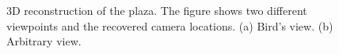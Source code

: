 \begin{figure}
\centerline{
}
\caption{3D reconstruction of the plaza. The figure shows two different viewpoints and the recovered camera locations. (a) Bird's view.  (b) Arbitrary view.}
\label{fig:sfm:3dpalma}
\end{figure}







